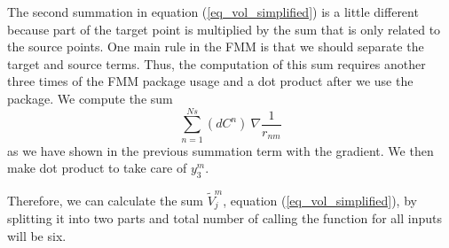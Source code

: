 \par
The second summation in equation (\ref{eq_vol_simplified}) is a little different because part of the target point is multiplied by the sum that is only related to the source points. One main rule in the FMM is that we should separate the target and source terms. Thus, the computation of this sum requires another three times of the FMM package usage and a dot product after we use the package. 
We compute the sum
\[
			 \sum_{n=1}^{Ns}  
			 \left( d{C}^n \right)  \
			\nabla
				\frac{1}{r_{nm}}
\]
as we have shown in the previous summation term with the gradient. We then make dot product to take care of $y_3^m$. 

%
%
Therefore, we can calculate the sum $\tilde{V}_j^m$, equation (\ref{eq_vol_simplified}), 
by splitting it into two parts and total number of calling the function for all inputs will be six. 
